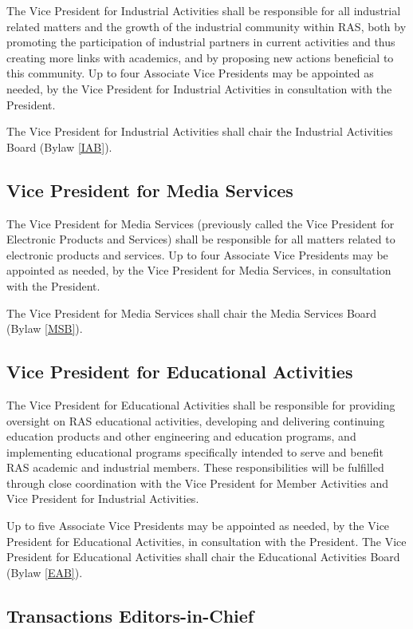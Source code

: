 \documentclass[10pt]{article}
\newcommand{\blref}[1]{Bylaw \ref{#1}}
\begin{document}
The Vice President for Industrial Activities shall be responsible for all industrial related matters and the growth of the industrial community within RAS, both by promoting the participation of industrial partners in current activities and thus creating more links with academics, and by proposing new actions beneficial to this community. Up to four Associate Vice Presidents may be appointed as needed, by the Vice President for Industrial Activities in consultation with the President. 

The Vice President for Industrial Activities shall chair the Industrial Activities Board (\blref{IAB}). 



\subsection{Vice President for Media Services}

The Vice President for Media Services (previously called the Vice President for Electronic Products and Services) shall be responsible for all matters related to electronic products and services. Up to four Associate Vice Presidents may be appointed as needed, by the Vice President for Media Services, in consultation with the President. 

The Vice President for Media Services shall chair the Media Services Board (\blref{MSB}).

\subsection{Vice President for Educational Activities}

The Vice President for Educational Activities shall be responsible for providing oversight on RAS educational activities, developing and delivering continuing education products and other engineering and education programs, and implementing educational programs specifically intended to serve and benefit RAS academic and industrial members. These responsibilities will be fulfilled through close coordination with the Vice President for Member Activities and Vice President for Industrial Activities. 

Up to five Associate Vice Presidents may be appointed as needed, by the Vice President for Educational Activities, in consultation with the President. 
The Vice President for Educational Activities shall chair the Educational Activities Board (\blref{EAB}).


\subsection{Transactions Editors-in-Chief}
\end{document}
